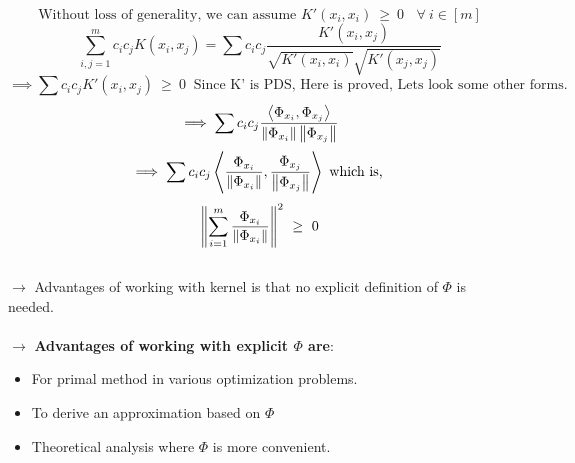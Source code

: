 \documentclass[a4paper,english,12pt]{article}
\begin{document}
    $$\text{Without loss of generality, we can assume }K'(x_i,x_i)~\geq~0~~~~\forall~i\in[m]$$
    $$\sum_{i,j=1}^{m}c_ic_jK(x_i,x_j)=\sum c_ic_j\frac{K'(x_i,x_j)}{\sqrt{K'(x_i,x_i)}\sqrt{K'(x_j,x_j)}}$$
    $$\implies\sum c_ic_jK'(x_i,x_j)~\geq~0~\text{ Since K' is PDS, Here is proved, Lets look some other forms.}$$
    $$\implies\sum c_ic_j\frac{\left\langle\Phi_{x_i}, \Phi_{x_j}\right\rangle}{\left\lVert\Phi_{x_i}\right\rVert\left\lVert\Phi_{x_j}\right\rVert}$$
    $$\implies\sum c_ic_j\left\langle\frac{\Phi_{x_i}}{\left\lVert\Phi_{x_i}\right\rVert}, \frac{\Phi_{x_j}}{\left\lVert\Phi_{x_j}\right\rVert}\right\rangle \text{ which is, }$$
    $$\left\lVert\sum_{i=1}^{m}\frac{\Phi_{x_i}}{\left\lVert\Phi_{x_i}\right\rVert}\right\rVert^2~\geq~0$$
    \\
    $\to$ Advantages of working with kernel is that no explicit definition of $\Phi$ is needed.\\\\
    $\to$ \textbf{Advantages of working with explicit $\Phi$ are}:
    \begin{itemize}
    	\item For primal method in various optimization problems.
    	\item To derive an approximation based on $\Phi$
    	\item Theoretical analysis where $\Phi$ is more convenient.
    \end{itemize}
\end{document}
